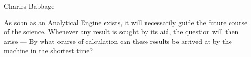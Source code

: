 \begin{frame}[shrink=10]{Charles Babbage}
\begin{myboxtitle}
As soon as an Analytical Engine exists, it will necessarily guide the future
course of the science. Whenever any result is sought by its aid, the question
will then arise --- \alert{By what course of calculation can these results be arrived at
by the machine in the shortest time?}
\end{myboxtitle}

\vspace{-12pt}



\end{frame}

